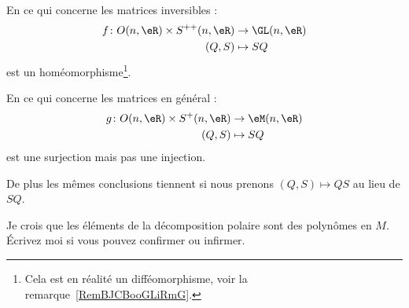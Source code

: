 \begin{theorem} \label{ThoLHebUAU}
	En ce qui concerne les matrices inversibles :
	\begin{equation}
		\begin{aligned}
			f\colon O(n,\eR)\times S^{++}(n,\eR) & \to \GL(n,\eR) \\
			(Q,S)                                & \mapsto SQ
		\end{aligned}
	\end{equation}
	est un homéomorphisme\footnote{Cela est en réalité un difféomorphisme, voir la remarque~\ref{RemBJCBooGLiRmG}.}.


	En ce qui concerne les matrices en général :
	\begin{equation}
		\begin{aligned}
			g\colon O(n,\eR)\times S^+(n,\eR) & \to \eM(n,\eR) \\
			(Q,S)                             & \mapsto SQ
		\end{aligned}
	\end{equation}
	est une surjection mais pas une injection.

	De plus les mêmes conclusions tiennent si nous prenons \( (Q,S)\mapsto QS\) au lieu de \( SQ\).
\end{theorem}


\begin{probleme}
	Je crois que les éléments de la décomposition polaire sont des polynômes en \( M\). Écrivez moi si vous pouvez confirmer ou infirmer.
\end{probleme}

